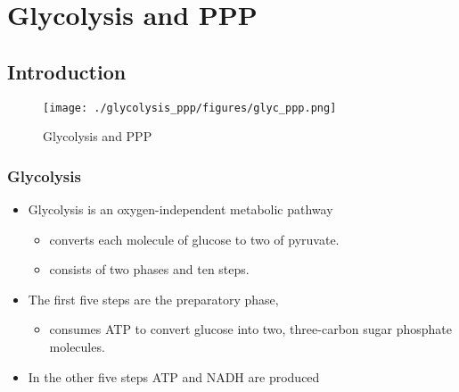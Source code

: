\documentclass{scrartcl}
\begin{document}
\section{Glycolysis and PPP}
\label{sec:orga17675e}
\subsection{Introduction}
\label{sec:orge50fa9e}
\begin{figure}[htbp]
\centering
\texttt{[image: ./glycolysis\_ppp/figures/glyc\_ppp.png]}
\caption{\label{fig:orgb5276a7}
Glycolysis and PPP}
\end{figure}

\subsubsection{Glycolysis}
\label{sec:orge86abca}
\begin{itemize}
\item Glycolysis is an oxygen-independent metabolic pathway
\begin{itemize}
\item converts each molecule of glucose to two of pyruvate.
\item consists of two phases and ten steps.
\end{itemize}
\item The first five steps are the preparatory phase,
\begin{itemize}
\item consumes ATP to convert glucose into two, three-carbon sugar
phosphate molecules.
\end{itemize}
\item In the other five steps ATP and NADH are produced
\end{itemize}
\end{document}
